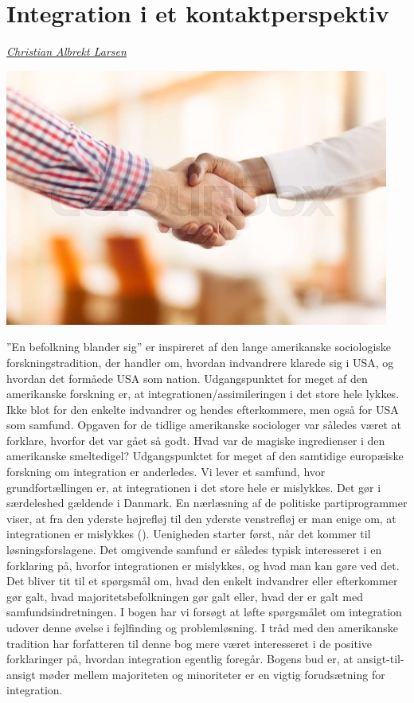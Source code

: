 \documentclass[
]{book}
\begin{document}
\chapter{Integration i et kontaktperspektiv}\label{kap7}

\emph{\href{https://vbn.aau.dk/en/persons/albrekt}{Christian Albrekt Larsen}}

\includegraphics[width=1\linewidth]{images/kap7}

''En befolkning blander sig'' er inspireret af den lange amerikanske sociologiske forskningstradition, der handler om, hvordan indvandrere klarede sig i USA, og hvordan det formåede USA som nation. Udgangspunktet for meget af den amerikanske forskning er, at integrationen/assimileringen i det store hele lykkes. Ikke blot for den enkelte indvandrer og hendes efterkommere, men også for USA som samfund. Opgaven for de tidlige amerikanske sociologer var således været at forklare, hvorfor det var gået så godt. Hvad var de magiske ingredienser i den amerikanske smeltedigel? Udgangspunktet for meget af den samtidige europæiske forskning om integration er anderledes. Vi lever et samfund, hvor grundfortællingen er, at integrationen i det store hele er mislykkes. Det gør i særdeleshed gældende i Danmark. En nærlæsning af de politiske partiprogrammer viser, at fra den yderste højrefløj til den yderste venstrefløj er man enige om, at integrationen er mislykkes (). Uenigheden starter først, når det kommer til løsningsforslagene. Det omgivende samfund er således typisk interesseret i en forklaring på, hvorfor integrationen er mislykkes, og hvad man kan gøre ved det. Det bliver tit til et spørgsmål om, hvad den enkelt indvandrer eller efterkommer gør galt, hvad majoritetsbefolkningen gør galt eller, hvad der er galt med samfundsindretningen. I bogen har vi forsøgt at løfte spørgsmålet om integration udover denne øvelse i fejlfinding og problemløsning. I tråd med den amerikanske tradition har forfatteren til denne bog mere været interesseret i de positive forklaringer på, hvordan integration egentlig foregår. Bogens bud er, at ansigt-til-ansigt møder mellem majoriteten og minoriteter er en vigtig forudsætning for integration.
\end{document}
